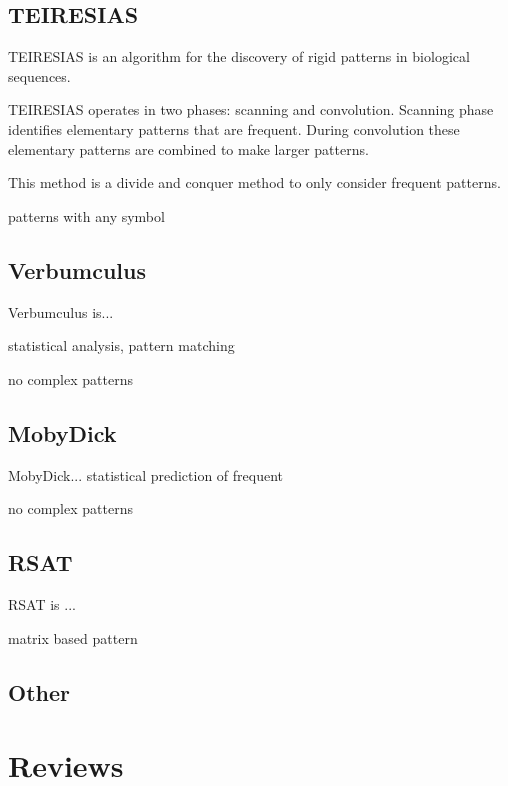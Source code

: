 \subsection{TEIRESIAS}

TEIRESIAS\cite{TEIRESIAS} is an algorithm for the discovery of rigid patterns in biological sequences. 

TEIRESIAS operates in two phases: scanning and convolution. Scanning phase identifies elementary patterns that are frequent. During convolution these elementary patterns are combined to make larger patterns.

This method is a divide and conquer method to only consider frequent patterns.

patterns with any symbol 


\subsection{Verbumculus}

Verbumculus\cite{Verbumculus} is...

statistical analysis, pattern matching

no complex patterns


\subsection{MobyDick}

MobyDick\cite{MobyDick}...
statistical prediction of frequent

no complex patterns


\subsection{RSAT}

RSAT\cite{RSAT} is ...

matrix based pattern


\subsection{Other}

\cite{NetworkMotifsDiscovery, GenericMotifSequential}

\section{Reviews}

